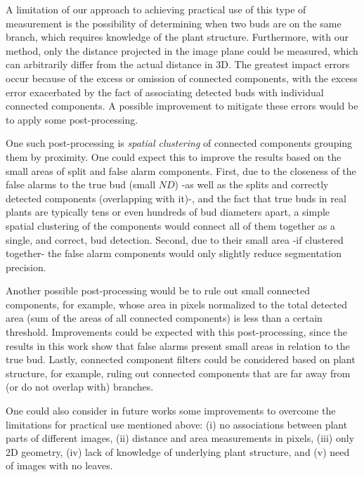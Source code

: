 \documentclass[a4paper,authoryear,review]{elsarticle}
\begin{document}
	A limitation of our approach to achieving practical use of this type of measurement is the possibility of determining when two buds are on the same branch, which requires knowledge of the plant structure. Furthermore, with our method, only the distance projected in the image plane could be measured, which can arbitrarily differ from the actual distance in 3D. The  greatest impact errors occur because of the excess or omission of connected components, with the excess error exacerbated by the fact of associating detected buds with individual connected components. A possible improvement to mitigate these errors would be to apply some post-processing. 
	
	One such post-processing is \emph{spatial clustering} of connected components grouping them by proximity. One could expect this to improve the results based on the small areas of split and false alarm components. First, due to the closeness of the false alarms to the true bud  (small $ND$) -as well as the splits and correctly detected components (overlapping with it)-,  and the fact that true buds in real plants are typically tens or even hundreds of bud diameters apart, a simple spatial clustering of the components would connect all of them together as a single, and correct, bud detection. Second, due to their small area -if clustered together- the false alarm components would only slightly reduce segmentation precision.
	
	Another possible post-processing would be to rule out small connected components, for example, whose area in pixels normalized to the total detected area (sum of the areas of all connected components) is less than a certain threshold. Improvements could be expected with this post-processing, since the results in this work show that false alarms present small areas in relation to the true bud. Lastly, connected component filters could be considered based on plant structure, for example, ruling out connected components that are far away from (or do not overlap with) branches.
	
	One could also consider in future works some improvements to overcome the limitations for practical use mentioned above: (i) no associations between plant parts of different images, (ii) distance and area measurements in pixels, (iii) only 2D geometry, (iv) lack of knowledge of underlying plant structure, and (v) need of images with no leaves. 
	
\end{document}
